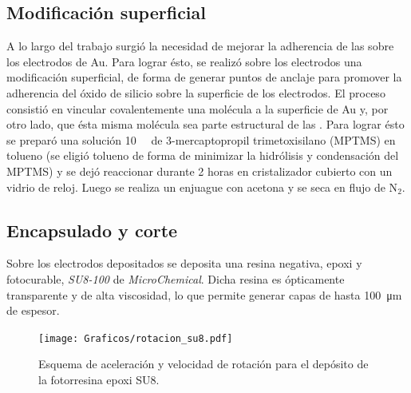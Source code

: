 	\subsection{Modificación superficial}\label{sec:silanizacion}
		
		A lo largo del trabajo surgió la necesidad de mejorar la adherencia de las \pdm\space sobre los electrodos de Au. Para lograr ésto, se realizó sobre los electrodos una modificación superficial, de forma de generar puntos de anclaje para promover la adherencia del óxido de silicio sobre la superficie de los electrodos.
		El proceso consistió en vincular covalentemente una molécula a la superficie de Au y, por otro lado, que ésta misma molécula sea parte estructural de las \pdm. Para lograr ésto se preparó una solución \SI{10}{\milli\Molar} de 3-mercaptopropil trimetoxisilano (MPTMS) en tolueno (se eligió tolueno de forma de minimizar la hidrólisis y condensación del MPTMS) y se dejó reaccionar durante 2 horas en cristalizador cubierto con un vidrio de reloj. \cite{Goss1991,Herzog2013} Luego se realiza un enjuague con acetona y se seca en flujo de N$_2$.

	\subsection{Encapsulado y corte}\label{sec:corte}

		Sobre los electrodos depositados se deposita una resina negativa, epoxi y fotocurable, \textit{SU8-100} de \textit{MicroChemical}\cite{MicrochemicalsTeam2009}. Dicha resina es ópticamente transparente y de alta viscosidad, lo que permite generar capas de hasta \SI{100}{\um} de espesor. 

		\begin{figure}[b!]
			 		  \begin{center}
			 		  \texttt{[image: Graficos/rotacion\_su8.pdf]}
			 		  \caption[Parámetros de depósito para la resina expoxi]{Esquema de aceleración y velocidad de rotación para el depósito de la fotorresina epoxi SU8.}
			 		  \label{fig:spin-su8}
			 		  \end{center}
			 		  \end{figure}

